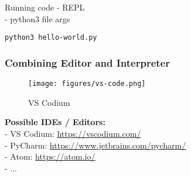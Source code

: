 \documentclass{beamer}
\begin{document}
\begin{frame}[fragile]
    \begin{block}{Running code}
        - REPL\\
        - python3 file args
    \end{block}
    \begin{example}
            \begin{verbatim}
python3 hello-world.py
        \end{verbatim}
    \end{example}
\end{frame}

\begin{frame}
    \frametitle{Combining Editor and Interpreter}
    \begin{figure}
        \texttt{[image: figures/vs-code.png]}
        \caption{VS Codium}
    \end{figure}
\end{frame}
\begin{frame}
    \textbf{Possible IDEs / Editors:}\\
    - VS Codium: \url{https://vscodium.com/}\\
    - PyCharm: \url{https://www.jetbrains.com/pycharm/}\\
    - Atom: \url{https://atom.io/}\\
    - ...
\end{frame}
\end{document}
